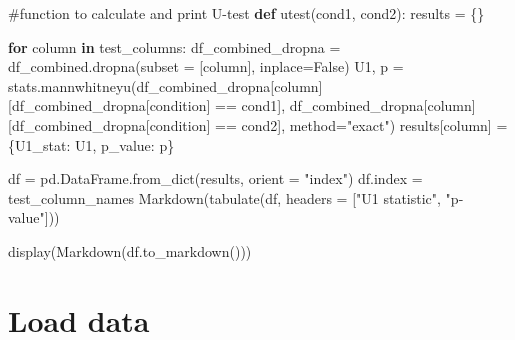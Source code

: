 \documentclass[
  letterpaper,
  DIV=11,
  numbers=noendperiod]{scrartcl}
\newenvironment{Shaded}{\begin{snugshade}}{\end{snugshade}}
\newcommand{\CommentTok}[1]{\textcolor[rgb]{0.37,0.37,0.37}{#1}}
\newcommand{\ControlFlowTok}[1]{\textcolor[rgb]{0.00,0.23,0.31}{\textbf{#1}}}
\newcommand{\KeywordTok}[1]{\textcolor[rgb]{0.00,0.23,0.31}{\textbf{#1}}}
\newcommand{\NormalTok}[1]{\textcolor[rgb]{0.00,0.23,0.31}{#1}}
\newcommand{\OperatorTok}[1]{\textcolor[rgb]{0.37,0.37,0.37}{#1}}
\newcommand{\StringTok}[1]{\textcolor[rgb]{0.13,0.47,0.30}{#1}}
\newcommand{\VariableTok}[1]{\textcolor[rgb]{0.07,0.07,0.07}{#1}}
\begin{document}
\begin{Shaded}
\begin{Highlighting}[]
\CommentTok{\#function to calculate and print U{-}test}
\KeywordTok{def}\NormalTok{ utest(cond1, cond2):}
\NormalTok{  results }\OperatorTok{=}\NormalTok{ \{\}}

  \ControlFlowTok{for}\NormalTok{ column }\KeywordTok{in}\NormalTok{ test\_columns:}
\NormalTok{    df\_combined\_dropna }\OperatorTok{=}\NormalTok{ df\_combined.dropna(subset }\OperatorTok{=}\NormalTok{ [column], inplace}\OperatorTok{=}\VariableTok{False}\NormalTok{)}
\NormalTok{    U1, p }\OperatorTok{=}\NormalTok{ stats.mannwhitneyu(df\_combined\_dropna[column][df\_combined\_dropna[}\StringTok{\textquotesingle{}condition\textquotesingle{}}\NormalTok{] }\OperatorTok{==}\NormalTok{ cond1],}
\NormalTok{                df\_combined\_dropna[column][df\_combined\_dropna[}\StringTok{\textquotesingle{}condition\textquotesingle{}}\NormalTok{] }\OperatorTok{==}\NormalTok{ cond2], method}\OperatorTok{=}\StringTok{"exact"}\NormalTok{)}
\NormalTok{    results[column] }\OperatorTok{=}\NormalTok{ \{}\StringTok{\textquotesingle{}U1\_stat\textquotesingle{}}\NormalTok{: U1, }\StringTok{\textquotesingle{}p\_value\textquotesingle{}}\NormalTok{: p\}}
  
\NormalTok{  df }\OperatorTok{=}\NormalTok{ pd.DataFrame.from\_dict(results, orient }\OperatorTok{=} \StringTok{"index"}\NormalTok{)}
\NormalTok{  df.index }\OperatorTok{=}\NormalTok{ test\_column\_names}
\NormalTok{  Markdown(tabulate(df, headers }\OperatorTok{=}\NormalTok{ [}\StringTok{"U1 statistic"}\NormalTok{, }\StringTok{"p{-}value"}\NormalTok{]))}

\NormalTok{  display(Markdown(df.to\_markdown()))}
\end{Highlighting}
\end{Shaded}

\section{Load data}\label{load-data}
\end{document}
